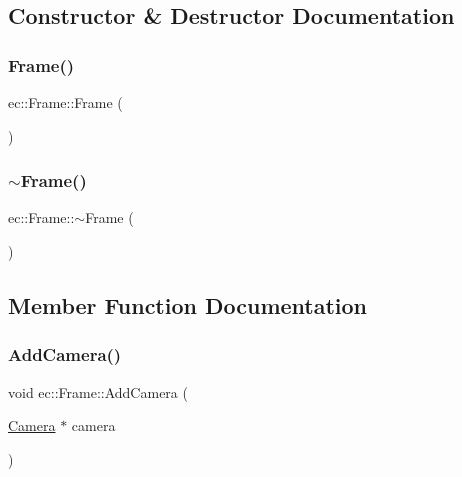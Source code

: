 \subsection{Constructor \& Destructor Documentation}
\mbox{\label{classec_1_1_frame_a80ed1da85818f646b6b80fb6c8a6c2a6}} 
\subsubsection{\texorpdfstring{Frame()}{Frame()}}
{\footnotesize\ttfamily ec\+::\+Frame\+::\+Frame (\begin{DoxyParamCaption}{ }\end{DoxyParamCaption})\hspace{0.3cm}{\ttfamily [explicit]}}

\mbox{\label{classec_1_1_frame_af2b2c733cacb47d99e460a2b75667eaa}} 
\subsubsection{\texorpdfstring{$\sim$\+Frame()}{~Frame()}}
{\footnotesize\ttfamily ec\+::\+Frame\+::$\sim$\+Frame (\begin{DoxyParamCaption}{ }\end{DoxyParamCaption})}



\subsection{Member Function Documentation}
\mbox{\label{classec_1_1_frame_ac77592eb8af14980e6b984c8433ffe8c}} 
\subsubsection{\texorpdfstring{Add\+Camera()}{AddCamera()}}
{\footnotesize\ttfamily void ec\+::\+Frame\+::\+Add\+Camera (\begin{DoxyParamCaption}\item[{\mbox{\hyperlink{classec_1_1_camera}{Camera}} $\ast$}]{camera }\end{DoxyParamCaption})}

